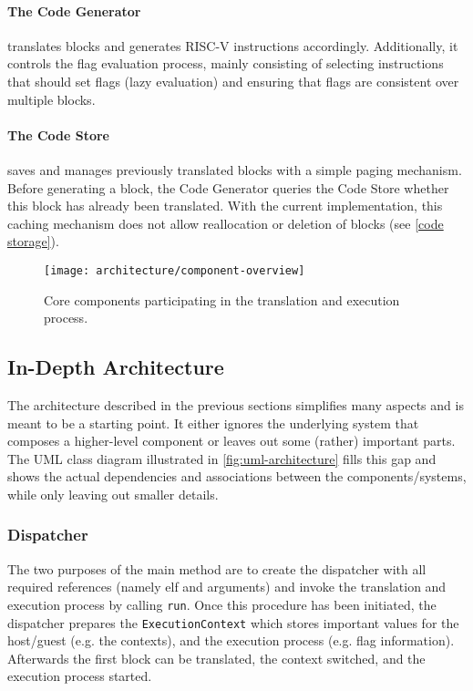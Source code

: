 		\paragraph{The Code Generator} translates blocks and generates RISC-V instructions accordingly. Additionally, it controls the flag evaluation process, mainly consisting of selecting instructions that should set flags (lazy evaluation) and ensuring that flags are consistent over multiple blocks.
		
		\paragraph{The Code Store} saves and manages previously translated blocks with a simple paging mechanism. Before generating a block, the Code Generator queries the Code Store whether this block has already been translated. With the current implementation, this caching mechanism does not allow reallocation or deletion of blocks (see \ref{code storage}).
		 
		\begin{figure}[htb]
			\centering
			\texttt{[image: architecture/component-overview]}
			\caption[Component Overview]{Core components participating in the translation and execution process.}
			\label{fig:component-overview}
		\end{figure}

\subsection{In-Depth Architecture}
	The architecture described in the previous sections simplifies many aspects and is meant to be a starting point. It either ignores the underlying system that composes a higher-level component or leaves out some (rather) important parts. The UML class diagram illustrated in \autoref{fig:uml-architecture} fills this gap and shows the actual dependencies and associations between the components/systems, while only leaving out smaller details.
	
	\subsubsection{Dispatcher}
		The two purposes of the main method are to create the dispatcher with all required references (namely elf and arguments) and invoke the translation and execution process by calling \texttt{run}. Once this procedure has been initiated, the dispatcher prepares the \texttt{ExecutionContext} which stores important values for the host/guest (e.g. the contexts), and the execution process (e.g. flag information). Afterwards the first block can be translated, the context switched, and the execution process started.
		
